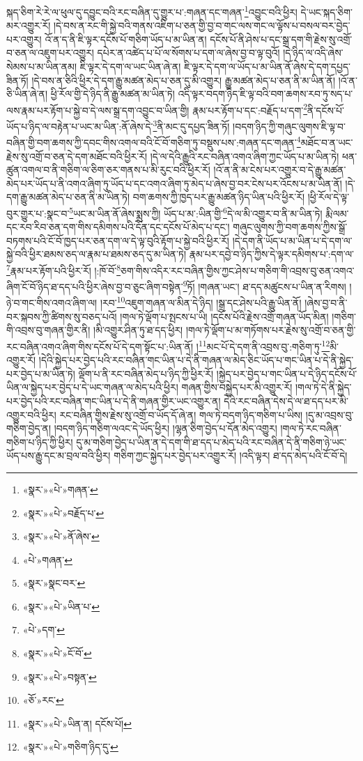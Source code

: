 སྐད་ཅིག་རེ་རེ་ལ་ཕུལ་དུ་དབྱུང་བའི་རང་བཞིན་དུ་གྱུར་པ་:གཞན་དང་གཞན་\footnote{«སྣར་»«པེ་»གཞན་}འབྱུང་བའི་ཕྱིར། དེ་ཡང་སྐད་ཅིག་མར་འགྱུར་རོ། །དེ་བས་ན་རང་གི་སྐྱེ་བའི་གནས་འཇིག་པ་ཅན་གྱི་བྱ་བ་གང་ལས་གང་ལ་ལྟོས་པ་བསལ་བར་བྱེད་པར་འགྱུར། འོ་ན་ད་ནི་ཇི་ལྟར་དངོས་པོ་གཅིག་ཡོད་པ་མ་ཡིན་ན། དངོས་པོ་ནི་ཤེས་པ་དང་སྒྲ་དག་གི་རྗེས་སུ་འགྲོ་བ་ཅན་ལ་འཇུག་པར་འགྱུར། དཔེར་ན་འཚེད་པ་པོ་ལ་སོགས་པ་དག་ལ་ཞེས་བྱ་བ་ལྟ་བུའོ། །དེ་ཉིད་ལ་འདི་ཞེས་སེམས་པ་མ་ཡིན་ནམ། ཇི་ལྟར་དེ་དག་ལ་ཡང་ཡིན་ཞེ་ན། ཇི་ལྟར་དེ་དག་ལ་ཡོད་པ་མ་ཡིན་ནོ་ཞེས་དེ་དག་དཔྱད་ཟིན་ཏོ། །དེ་བས་ན་ཅིའི་ཕྱིར་དེ་དག་རྒྱུ་མཚན་མེད་པ་ཅན་དུ་མི་འགྱུར། རྒྱུ་མཚན་མེད་པ་ཅན་ནི་མ་ཡིན་ནོ། །འོ་ན་ཅི་ཡིན་ཞེ་ན། ཕྱི་རོལ་གྱི་དེ་ཉིད་ནི་རྒྱུ་མཚན་མ་ཡིན་ཏེ། འདི་ལྟར་བདག་ཉིད་ཇི་ལྟ་བའི་བག་ཆགས་རབ་ཏུ་སད་པ་ལས་རྣམ་པར་རྟོག་པ་སྐྱེ་བ་དེ་ལས་སྒྲ་དག་འབྱུང་བ་ཡིན་གྱི། རྣམ་པར་རྟོག་པ་དང་:བརྗོད་པ་དག་\footnote{«སྣར་»«པེ་»བརྗོད་པ་}ནི་དངོས་པོ་ཡོད་པ་ཉིད་ལ་བརྟེན་པ་ཡང་མ་ཡིན་:ནོ་ཞེས་དེ་\footnote{«སྣར་»«པེ་»ནོ་ཞེས་}ནི་མང་དུ་དཔྱད་ཟིན་ཏོ། །བདག་ཉིད་ཀྱི་གཞུང་ལུགས་ཇི་ལྟ་བ་བཞིན་གྱི་བག་ཆགས་ཀྱི་དབང་གིས་འགལ་བའི་ངོ་བོ་གཅིག་ཏུ་བསྡུས་པས་:གཞན་དང་གཞན་\footnote{«པེ་»གཞན་}མཐོང་བ་ན་ཡང་རྗེས་སུ་འགྲོ་བ་ཅན་དེ་དག་མཐོང་བའི་ཕྱིར་རོ། །དེ་ལ་དེའི་རྒྱུའི་རང་བཞིན་འགའ་ཞིག་ཀྱང་ཡོད་པ་མ་ཡིན་ཏེ། ཕན་ཚུན་འགལ་བ་ནི་གཅིག་ལ་ཅིག་ཅར་གནས་པ་མི་རུང་བའི་ཕྱིར་རོ། །འོ་ན་ནི་མ་ངེས་པར་འགྱུར་བ་དེ་རྒྱུ་མཚན་མེད་པར་ཡོད་པ་ནི་འགའ་ཞིག་ཏུ་ཡོད་པ་དང་འགའ་ཞིག་ཏུ་མེད་པ་ཞེས་བྱ་བར་ངེས་པར་འོངས་པ་མ་ཡིན་ནོ། །དེ་དག་རྒྱུ་མཚན་མེད་པ་ཅན་ནི་མ་ཡིན་ཏེ། བག་ཆགས་ཀྱི་ཁྱད་པར་རྒྱུ་མཚན་ཉིད་ཡིན་པའི་ཕྱིར་རོ། །ཕྱི་རོལ་དེ་ལྟ་བུར་གྱུར་པ་:སྣང་བ་\footnote{«སྣར་»སྣང་བར་}ཡང་མ་ཡིན་ནོ་ཞེས་སྨྲས་ཀྱི། ཡོད་པ་མ་:ཡིན་གྱི་\footnote{«སྣར་»«པེ་»ཡིན་པ་}དེ་ལ་མི་འགྱུར་བ་ནི་མ་ཡིན་ཏེ། རྨི་ལམ་དང་རབ་རིབ་ཅན་དག་གིས་དམིགས་པའི་དོན་དང་དངོས་པོ་མེད་པ་དང་། གཞུང་ལུགས་ཀྱི་བག་ཆགས་ཀྱིས་སྒྲོ་བཏགས་པའི་ངོ་བོ་ཁྱད་པར་ཅན་དག་ལ་དེ་ལྟ་བུའི་རྟོག་པ་སྐྱེ་བའི་ཕྱིར་རོ། །དེ་དག་ནི་ཡོད་པ་མ་ཡིན་པ་དེ་དག་ལ་སྐྱེ་བའི་ཕྱིར་ཐམས་ཅད་ལ་རྣམ་པ་ཐམས་ཅད་དུ་མ་ཡིན་ཏེ། རྣམ་པར་དབྱེ་བ་ཉིད་ཀྱིས་དེ་ལྟར་དམིགས་པ་:དག་ལ་\footnote{«པེ་»དག་}རྣམ་པར་རྟོག་པའི་ཕྱིར་རོ། །:ཁོ་བོ་\footnote{«སྣར་»«པེ་»ངོ་བོ་}ཅག་གིས་འདིར་རང་བཞིན་གྱིས་ཀྱང་ཤེས་པ་གཅིག་གི་འབྲས་བུ་ཅན་འགའ་ཞིག་ངོ་བོ་ཉིད་ཐ་དད་པའི་ཕྱིར་ཞེས་བྱ་བ་ཅུང་ཞིག་བསྟེན་\footnote{«སྣར་»«པེ་»བསྟན་}ཏོ། །གཞན་ཡང་། ཐ་དད་མཚུངས་པ་ཡིན་ན་རིགས། །ཉེ་བ་གང་གིས་འགའ་ཞིག་ལ། །རབ་\footnote{«ཅོ་»རང་}འཇུག་གཞན་ལ་མིན་དེ་ཉིད། །སྒྲ་དང་ཤེས་པའི་རྒྱུ་ཡིན་ནོ། །ཞེས་བྱ་བ་ནི་བར་སྐབས་ཀྱི་ཚིགས་སུ་བཅད་པའོ། །གལ་ཏེ་ལྡོག་པ་སྤངས་པ་ཡི། །དངོས་པོའི་རྗེས་འགྲོ་གཞན་ཡོད་མིན། །གཅིག་གི་འབྲས་བུ་གཞན་གྱིར་ནི། །མི་འགྱུར་ཤིན་ཏུ་ཐ་དད་ཕྱིར། །གལ་ཏེ་ལྡོག་པ་མ་གཏོགས་པར་རྗེས་སུ་འགྲོ་བ་ཅན་གྱི་རང་བཞིན་འགའ་ཞིག་གིས་དངོས་པོ་དེ་དག་སྟོང་པ་:ཡིན་ནོ། །\footnote{«སྣར་»«པེ་»ཡིན་ན། དངོས་པོ།}མང་པོ་དེ་དག་ནི་འབྲས་བུ་:གཅིག་ཏུ་\footnote{«སྣར་»«པེ་»གཅིག་ཉིད་དུ་}མི་འགྱུར་རོ། །དེའི་སྐྱེད་པར་བྱེད་པའི་རང་བཞིན་གང་ཡིན་པ་དེ་ནི་གཞན་ལ་མེད་ཅིང་ཡོད་པ་གང་ཡིན་པ་དེ་ནི་སྐྱེད་པར་བྱེད་པ་མ་ཡིན་ཏེ། ལྡོག་པ་ནི་རང་བཞིན་མེད་པ་ཉིད་ཀྱི་ཕྱིར་རོ། །སྐྱེད་པར་བྱེད་པ་གང་ཡིན་པ་དེ་ཉིད་དངོས་པོ་ཡིན་ལ་སྐྱེད་པར་བྱེད་པ་དེ་ཡང་གཞན་ལ་མེད་པའི་ཕྱིར། གཞན་གྱིས་བསྐྱེད་པར་མི་འགྱུར་རོ། །གལ་ཏེ་དེ་ནི་སྐྱེད་པར་བྱེད་པའི་རང་བཞིན་གང་ཡིན་པ་དེ་ནི་གཞན་གྱིར་ཡང་འགྱུར་ན། དེའི་རང་བཞིན་དེས་དེ་ལ་ཐ་དད་པར་མི་འགྱུར་བའི་ཕྱིར། རང་བཞིན་གྱིས་རྗེས་སུ་འགྲོ་བ་ཡོད་དོ་ཞེ་ན། གལ་ཏེ་བདག་ཉིད་གཅིག་པ་ཡིས། །དུ་མ་འབྲས་བུ་གཅིག་བྱེད་ན། །བདག་ཉིད་གཅིག་ལའང་དེ་ཡོད་ཕྱིར། །ལྷན་ཅིག་བྱེད་པ་དོན་མེད་འགྱུར། །གལ་ཏེ་རང་བཞིན་གཅིག་པ་ཉིད་ཀྱི་ཕྱིར། དུ་མ་གཅིག་བྱེད་པ་ཡིན་ན་དེ་དག་གི་ཐ་དད་པ་མེད་པའི་རང་བཞིན་དེ་ནི་གཅིག་ཉེ་ཡང་ཡོད་པས་རྒྱུ་དང་མ་བྲལ་བའི་ཕྱིར། གཅིག་ཀྱང་སྐྱེད་པར་བྱེད་པར་འགྱུར་རོ། །འདི་ལྟར། ཐ་དད་མེད་པའི་ངོ་བོ་དེ། 